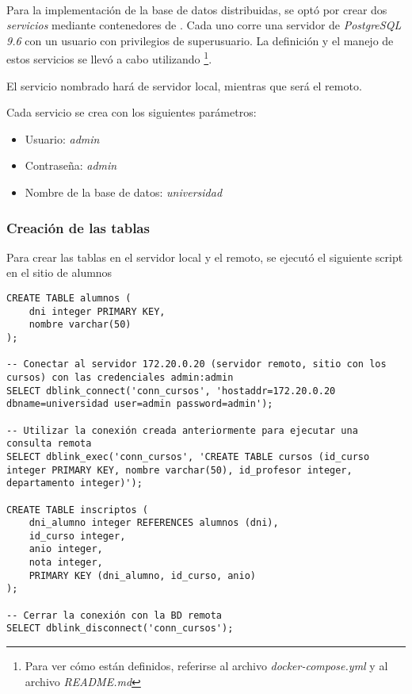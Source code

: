 ~\\

Para la implementación de la base de datos distribuidas, se optó por crear dos \emph{servicios} mediante contenedores de \docker{}. Cada uno corre una servidor de \emph{PostgreSQL 9.6} con un usuario con privilegios de superusuario. La definición y el manejo de estos servicios se llevó a cabo utilizando \doccom{} \footnote{Para ver cómo están definidos, referirse al archivo \emph{docker-compose.yml} y al archivo \emph{README.md}}.

El servicio nombrado  hará de servidor local, mientras que  será el remoto.

Cada servicio se crea con los siguientes parámetros:
\begin{itemize}
    \item Usuario: \emph{admin} 
    \item Contraseña: \emph{admin} 
    \item Nombre de la base de datos: \emph{universidad} 
\end{itemize}

\subsubsection{Creación de las tablas}

Para crear las tablas en el servidor local y el remoto, se ejecutó el siguiente script en el sitio de alumnos

\vspace*{5mm}
\begin{lstlisting}[title=Definición de las tablas (el script SQL es \emph{crear\_tablas\_locales\_remotas.sql})]
CREATE TABLE alumnos (
    dni integer PRIMARY KEY,
    nombre varchar(50)
);

-- Conectar al servidor 172.20.0.20 (servidor remoto, sitio con los cursos) con las credenciales admin:admin
SELECT dblink_connect('conn_cursos', 'hostaddr=172.20.0.20 dbname=universidad user=admin password=admin');

-- Utilizar la conexión creada anteriormente para ejecutar una consulta remota
SELECT dblink_exec('conn_cursos', 'CREATE TABLE cursos (id_curso integer PRIMARY KEY, nombre varchar(50), id_profesor integer, departamento integer)');

CREATE TABLE inscriptos (
    dni_alumno integer REFERENCES alumnos (dni),
    id_curso integer,
    anio integer,
    nota integer,
    PRIMARY KEY (dni_alumno, id_curso, anio)
);

-- Cerrar la conexión con la BD remota
SELECT dblink_disconnect('conn_cursos');
\end{lstlisting}

